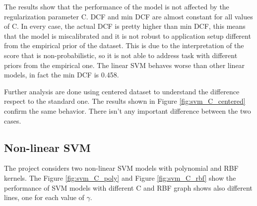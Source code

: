 \documentclass{article}
\begin{document}
The results show that the performance of the model is not affected by the regularization parameter C. DCF and min DCF are almost constant for all values of C. In every case, the actual DCF is pretty higher than min DCF, this means that the model is miscalibrated and it is not robust to application setup different from the empirical prior of the dataset. This is due to the interpretation of the score that is non-probabilistic, so it is not able to address task with different priors from the empirical one. The linear SVM behaves worse than other linear models, in fact the min DCF is 0.458.

Further analysis are done using centered dataset to understand the difference respect to the standard one. The results shown in Figure \ref{fig:svm_C_centered} confirm the same behavior. There isn't any important difference between the two cases.

\subsection{Non-linear SVM}
The project considers two non-linear SVM models with polynomial and RBF kernels. The Figure \ref{fig:svm_C_poly} and Figure \ref{fig:svm_C_rbf} show the performance of SVM models with different C and RBF graph shows also different lines, one for each value of $\gamma$.
\end{document}
